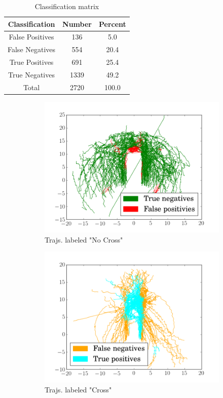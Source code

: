 \begin{table}[ht!]
\centering
\begin{tabular}{||c||c c||}  
 \hline
 Classification & Number & Percent \\
 \hline\hline
 False Positives & 136 & 5.0 \\ \hline
 False Negatives & 554 & 20.4 \\ \hline
 True Positives & 691 & 25.4 \\ \hline
 True Negatives & 1339 & 49.2 \\ \hline\hline
 Total & 2720 & 100.0\\ \hline
\end{tabular}
\caption{Classification matrix}
\label{table_svm_outputs}
\end{table}


\begin{figure}
\centering
\begin{subfigure}{.25\textwidth}
  \centering
  \includegraphics[width=.9\linewidth]{figures/svm_label0}
  \caption{Trajs. labeled "No Cross"}
  \label{fig:svm_label0}
\end{subfigure}%
\begin{subfigure}{.25\textwidth}
  \centering
  \includegraphics[width=.9\linewidth]{figures/svm_label1}
  \caption{Trajs. labeled "Cross"}
  \label{fig:svm_label1}
\end{subfigure}
\caption{}
\label{fig:svm_labels}
\end{figure}

